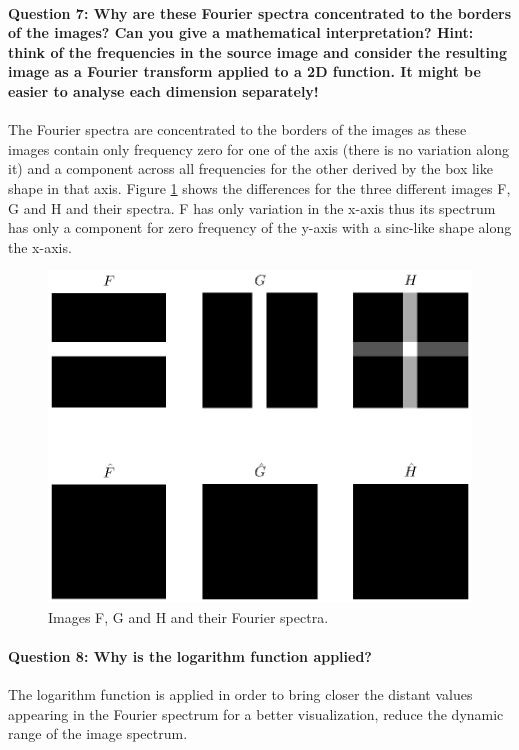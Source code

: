 \documentclass[12pt]{article}
\begin{document}
\paragraph{Question 7: Why are these Fourier spectra concentrated to the borders of the images? Can you give a mathematical interpretation? Hint: think of the frequencies in the source image and consider the resulting image as a Fourier transform applied to a 2D function. It might be easier to analyse each dimension separately!}
The Fourier spectra are concentrated to the borders of the images as these images contain only frequency zero for one of the axis (there is no variation along it) and a component across all frequencies for the other derived by the box like shape in that axis. Figure \ref{fig:q7_1} shows the differences for the three different images F, G and H and their spectra. F has only variation in the x-axis thus its spectrum has only a component for zero frequency of the y-axis with a sinc-like shape along the x-axis.

\begin{figure}[htbp]
 \centering
 \includegraphics[width=\textwidth]{q7_1}
 \caption{Images F, G and H and their Fourier spectra.}
 \label{fig:q7_1}
\end{figure}

\paragraph{Question 8: Why is the logarithm function applied?}
The logarithm function is applied in order to bring closer the distant values appearing in the Fourier spectrum for a better visualization, reduce the dynamic range of the image spectrum.
\end{document}

